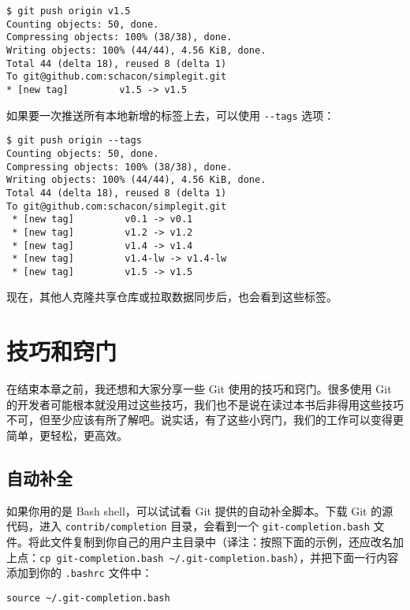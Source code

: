 \documentclass[a4paper]{book}
\begin{document}
\begin{shaded}\begin{verbatim}
$ git push origin v1.5
Counting objects: 50, done.
Compressing objects: 100% (38/38), done.
Writing objects: 100% (44/44), 4.56 KiB, done.
Total 44 (delta 18), reused 8 (delta 1)
To git@github.com:schacon/simplegit.git
* [new tag]         v1.5 -> v1.5
\end{verbatim}\end{shaded}

如果要一次推送所有本地新增的标签上去，可以使用 \texttt{-{}-tags} 选项：

\begin{shaded}\begin{verbatim}
$ git push origin --tags
Counting objects: 50, done.
Compressing objects: 100% (38/38), done.
Writing objects: 100% (44/44), 4.56 KiB, done.
Total 44 (delta 18), reused 8 (delta 1)
To git@github.com:schacon/simplegit.git
 * [new tag]         v0.1 -> v0.1
 * [new tag]         v1.2 -> v1.2
 * [new tag]         v1.4 -> v1.4
 * [new tag]         v1.4-lw -> v1.4-lw
 * [new tag]         v1.5 -> v1.5
\end{verbatim}\end{shaded}

现在，其他人克隆共享仓库或拉取数据同步后，也会看到这些标签。

\section{技巧和窍门}

在结束本章之前，我还想和大家分享一些 Git 使用的技巧和窍门。很多使用 Git 的开发者可能根本就没用过这些技巧，我们也不是说在读过本书后非得用这些技巧不可，但至少应该有所了解吧。说实话，有了这些小窍门，我们的工作可以变得更简单，更轻松，更高效。

\subsection{自动补全}

如果你用的是 Bash shell，可以试试看 Git 提供的自动补全脚本。下载 Git 的源代码，进入 \texttt{contrib/completion} 目录，会看到一个 \texttt{git-completion.bash} 文件。将此文件复制到你自己的用户主目录中（译注：按照下面的示例，还应改名加上点：\texttt{cp git-completion.bash \textasciitilde{}/.git-completion.bash}），并把下面一行内容添加到你的 \texttt{.bashrc} 文件中：

\begin{shaded}\begin{verbatim}
source ~/.git-completion.bash
\end{verbatim}\end{shaded}
\end{document}
